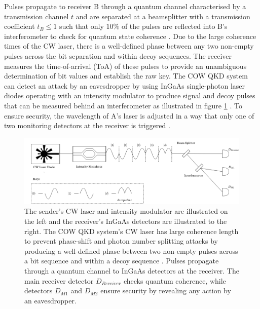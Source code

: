 Pulses propagate to receiver B through a quantum channel characterised by a transmission channel $t$ and are separated at a beamsplitter with a transmission coefficient $t_B \leq 1$ such that only $10\%$ of the pulses are reflected into B's \gls{interferometer} to check for quantum state coherence \cite{peev2009secoqc}. Due to the large coherence times of the CW laser, there is a well-defined phase between any two non-empty pulses across the bit separation and within decoy sequences. The receiver measures the time-of-arrival (ToA) of these pulses to provide an unambiguous determination of bit values and establish the raw key. The COW QKD system can detect an attack by an eavesdropper by using InGaAs single-photon laser diodes operating with an intensity modulator to produce signal and decoy pulses that can be measured behind an \gls{interferometer} as illustrated in figure \ref{fig:cow-protocol} \cite{peev2009secoqc}. To ensure security, the wavelength of A's laser is adjusted in a way that only one of two monitoring detectors at the receiver is triggered \cite{peev2009secoqc}. 
\begin{figure}[!ht]
	\centering
	\includegraphics[width=1.0\linewidth]{body/ch3/figs/cow-protocol}
	\caption[Coherent One-Way (COW) Quantum Key Distribution System by GAP University of Geneva.]{The sender's CW laser and intensity modulator are illustrated on the left and the receiver's InGaAs detectors are illustrated to the right. The COW QKD system's CW laser has large coherence length to prevent phase-shift and photon number splitting attacks by producing a well-defined phase between two non-empty pulses across a bit sequence and within a decoy sequence \cite{peev2009secoqc}. Pulses propagate through a quantum channel to InGaAs detectors at the receiver. The main receiver detector $D_{Receiver}$ checks quantum coherence, while detectors $D_{M1}$ and $D_{M2}$ ensure security by revealing any action by an eavesdropper.}
	\label{fig:cow-protocol}
\end{figure}
